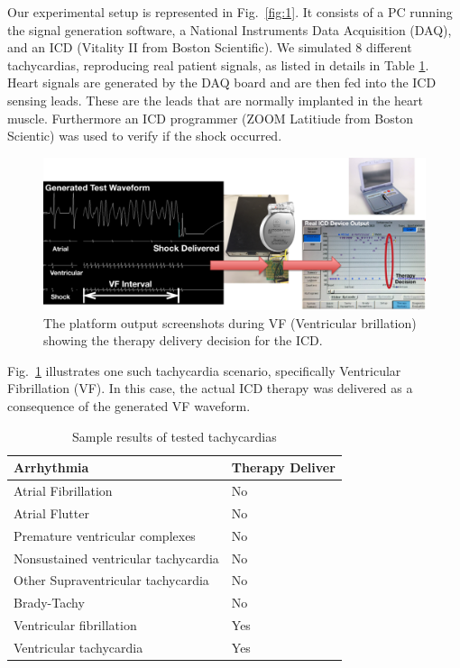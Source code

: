 \documentclass[a4paper, 10pt, conference]{ieeeconf}      %
\begin{document}
Our experimental setup is represented in Fig.~\ref{fig:1}.
It consists of a PC running the signal generation software, a National Instruments Data Acquisition (DAQ), and an ICD  (Vitality II from Boston Scientific). 
We simulated 8 different tachycardias, reproducing real patient signals, as listed in details in Table \ref{tab:1}.  
Heart signals are generated by the DAQ board and are then fed into the ICD sensing leads. 
These are the leads that are normally implanted in the heart muscle.
Furthermore an ICD programmer (ZOOM Latitiude from Boston Scientic) was used to verify if the shock occurred.

\begin{figure}[t]
	\centering
	\includegraphics[scale=0.32]{Fig2.png}
	\caption{\small The platform output screenshots during VF  (Ventricular brillation) showing the therapy delivery decision for the ICD.}
	\vspace{-5pt}
	\label{fig:2}
\end{figure}

Fig.~\ref{fig:2} illustrates one such tachycardia scenario, specifically Ventricular Fibrillation (VF). In this case, the actual ICD  therapy was delivered as a consequence of the generated VF waveform.

\begin{table}
\caption{Sample results of tested tachycardias}
\begin{tabular}{|p{2in}|p{1in}|}
	\hline \textbf{Arrhythmia} & \textbf{Therapy Deliver} \\
	\hline Atrial Fibrillation & No\\
	\hline Atrial Flutter & No\\
	\hline Premature ventricular complexes & No \\
	\hline Nonsustained ventricular tachycardia & No\\
	\hline Other Supraventricular tachycardia & No \\
	\hline Brady-Tachy & No \\
	\hline Ventricular fibrillation & Yes \\
	\hline Ventricular tachycardia & Yes \\
	\hline
\end{tabular}
\vspace{-10pt}
\label{tab:1}
\end{table}
\end{document}

